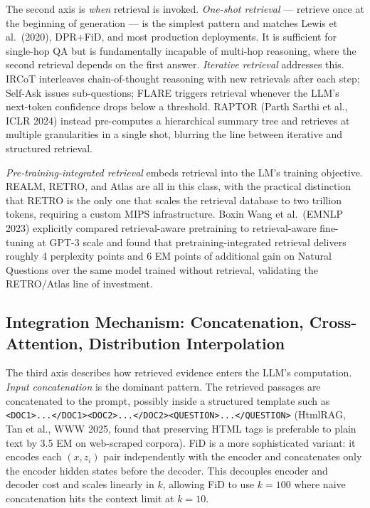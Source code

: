 \documentclass{article}
\begin{document}
The second axis is \emph{when} retrieval is invoked. \emph{One-shot retrieval} --- retrieve once at the beginning of generation --- is the simplest pattern and matches Lewis et al.~(2020), DPR+FiD, and most production deployments. It is sufficient for single-hop QA but is fundamentally incapable of multi-hop reasoning, where the second retrieval depends on the first answer. \emph{Iterative retrieval} addresses this. IRCoT \citep{trivedi2023interleavingretrie} interleaves chain-of-thought reasoning with new retrievals after each step; Self-Ask \citep{press2023measuringandnarrow} issues sub-questions; FLARE \citep{jiang2023activeretrievalaug} triggers retrieval whenever the LLM's next-token confidence drops below a threshold. RAPTOR (Parth Sarthi et al., ICLR 2024) instead pre-computes a hierarchical summary tree and retrieves at multiple granularities in a single shot, blurring the line between iterative and structured retrieval.

\emph{Pre-training-integrated retrieval} embeds retrieval into the LM's training objective. REALM, RETRO, and Atlas are all in this class, with the practical distinction that RETRO is the only one that scales the retrieval database to two trillion tokens, requiring a custom MIPS infrastructure. Boxin Wang et al.~(EMNLP 2023) explicitly compared retrieval-aware pretraining to retrieval-aware fine-tuning at GPT-3 scale and found that pretraining-integrated retrieval delivers roughly 4 perplexity points and 6 EM points of additional gain on Natural Questions over the same model trained without retrieval, validating the RETRO/Atlas line of investment.

\subsection{Integration Mechanism: Concatenation, Cross-Attention, Distribution Interpolation}\label{integration-mechanism-concatenation-cross-attention-distribution-interpolation}

The third axis describes how retrieved evidence enters the LLM's computation. \emph{Input concatenation} is the dominant pattern. The retrieved passages are concatenated to the prompt, possibly inside a structured template such as \texttt{\textless{}DOC1\textgreater{}...\textless{}/DOC1\textgreater{}\textless{}DOC2\textgreater{}...\textless{}/DOC2\textgreater{}\textless{}QUESTION\textgreater{}...\textless{}/QUESTION\textgreater{}} (HtmlRAG, Tan et al., WWW 2025, found that preserving HTML tags is preferable to plain text by 3.5 EM on web-scraped corpora). FiD \citep{izacard2021leveragingpassager} is a more sophisticated variant: it encodes each \((x, z_i)\) pair independently with the encoder and concatenates only the encoder hidden states before the decoder. This decouples encoder and decoder cost and scales linearly in \(k\), allowing FiD to use \(k=100\) where naive concatenation hits the context limit at \(k=10\).
\end{document}
